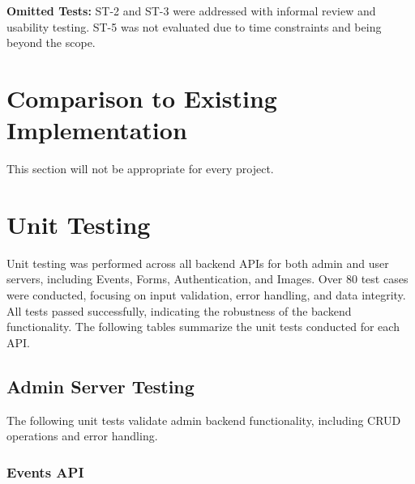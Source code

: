 \documentclass[12pt, titlepage]{article}
\begin{document}
\textbf{Omitted Tests:} ST-2 and ST-3 were addressed with informal review and usability testing. ST-5 was not evaluated due to time constraints and being beyond the scope.

\section{Comparison to Existing Implementation}

This section will not be appropriate for every project.

\section{Unit Testing}

Unit testing was performed across all backend APIs for both admin and user servers, including Events, Forms, Authentication, and Images. Over 80 test cases were conducted, focusing on input validation, error handling, and data integrity. All tests passed successfully, indicating the robustness of the backend functionality. The following tables summarize the unit tests conducted for each API.

\subsection{Admin Server Testing}
The following unit tests validate admin backend functionality, including CRUD operations and error handling.

\subsubsection{Events API}
\end{document}
